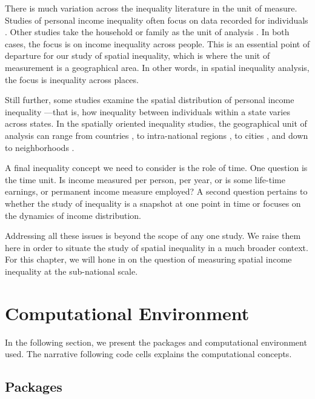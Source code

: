\documentclass[
  a4paper, 
  twoside,
  final
]{article}
\newcounter{code}
\begin{document}
There is much variation across the inequality literature in the unit of
measure. Studies of personal income inequality often focus on data
recorded for individuals \citep{piketty2003IncomeInequality}. Other
studies take the household or family as the unit of analysis
\citep{brandolini2011IncomeInequality}. In both cases, the focus is on
income inequality across people. This is an essential point of departure
for our study of spatial inequality, which is where the unit of
measurement is a geographical area. In other words, in spatial
inequality analysis, the focus is inequality across places.

Still further, some studies examine the spatial distribution of personal
income inequality
\citep{partridge1998StatePatterns, frank2009InequalityGrowth}---that is,
how inequality between individuals within a state varies across states.
In the spatially oriented inequality studies, the geographical unit of
analysis can range from countries \citep{milanovic2018GlobalInequality},
to intra-national regions \citep{ganong2017WhyHas}, to cities
\citep{u.s.departmentofcommerce2023GeographicInequality}, and down to
neighborhoods \citep{nijman2020UrbanInequalities}.

A final inequality concept we need to consider is the role of time. One
question is the time unit. Is income measured per person, per year, or
is some life-time earnings, or permanent income
\citep{hall1978StochasticImplications} measure employed? A second
question pertains to whether the study of inequality is a snapshot at
one point in time or focuses on the dynamics of income distribution.

Addressing all these issues is beyond the scope of any one study. We
raise them here in order to situate the study of spatial inequality in a
much broader context. For this chapter, we will hone in on the question
of measuring spatial income inequality at the sub-national scale.

\section{Computational Environment}\label{computational-environment}

In the following section, we present the packages and computational
environment used. The narrative following code cells explains the
computational concepts.

\subsection{Packages}\label{packages}
\end{document}
